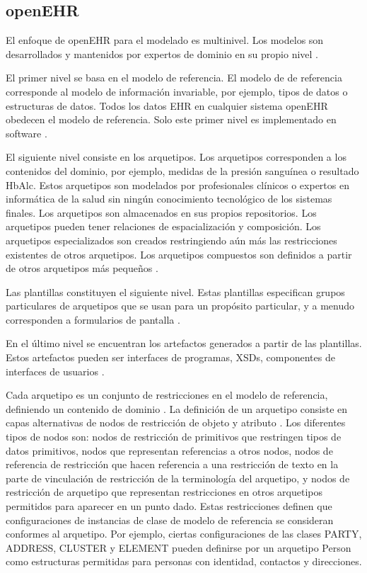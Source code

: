 \subsection{openEHR}

El enfoque de openEHR para el modelado es multinivel. Los modelos son desarrollados y mantenidos por expertos de dominio en su propio nivel \cite{openEHRArchitecture}.

El primer nivel se basa en el modelo de referencia. El modelo de de referencia corresponde al modelo de información invariable, por ejemplo, tipos de datos o estructuras de datos. Todos los datos EHR en cualquier sistema openEHR obedecen el modelo de referencia. Solo este primer nivel es implementado en software \cite{openEHRArchitecture}.

El siguiente nivel consiste en los arquetipos. Los arquetipos corresponden a los contenidos del dominio, por ejemplo, medidas de la presión sanguínea o resultado HbAlc. Estos arquetipos son modelados por profesionales clínicos o expertos en informática de la salud sin ningún conocimiento tecnológico de los sistemas finales. Los arquetipos son almacenados en sus propios repositorios. Los arquetipos pueden tener relaciones de espacialización y composición. Los arquetipos especializados son creados restringiendo aún más las restricciones existentes de otros arquetipos. Los arquetipos compuestos son definidos a partir de otros arquetipos más pequeños \cite{openEHRArchitecture}.

Las plantillas constituyen el siguiente nivel. Estas plantillas especifican grupos particulares de arquetipos que se usan para un propósito particular, y a menudo corresponden a formularios de pantalla \cite{openEHRArchitecture}.

En el último nivel se encuentran los artefactos generados a partir de las plantillas. Estos artefactos pueden ser interfaces de programas, XSDs, componentes de interfaces de usuarios \cite{openEHR}.

Cada arquetipo es un conjunto de restricciones en el modelo de referencia, definiendo un contenido de dominio \cite{openEHRArchitecture}. La definición de un arquetipo consiste en capas alternativas de nodos de restricción de objeto y atributo \cite{openEHRAOM}. Los diferentes tipos de nodos son: nodos de restricción de primitivos que restringen tipos de datos primitivos, nodos que representan referencias a otros nodos, nodos de referencia de restricción que hacen referencia a una restricción de texto en la parte de vinculación de restricción de la terminología del arquetipo, y nodos de restricción de arquetipo que representan restricciones en otros arquetipos permitidos para aparecer en un punto dado. Estas restricciones definen que configuraciones de instancias de clase de modelo de referencia se consideran conformes al arquetipo. Por ejemplo, ciertas configuraciones de las clases PARTY, ADDRESS, CLUSTER y ELEMENT pueden definirse por un arquetipo Person como estructuras permitidas para personas con identidad, contactos y direcciones.

